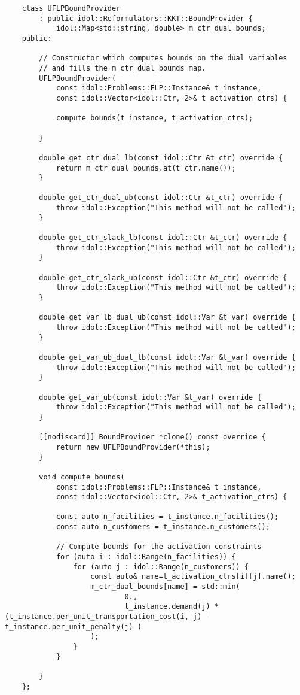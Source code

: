 \begin{lstlisting}
    class UFLPBoundProvider
        : public idol::Reformulators::KKT::BoundProvider {
            idol::Map<std::string, double> m_ctr_dual_bounds;
    public:

        // Constructor which computes bounds on the dual variables 
        // and fills the m_ctr_dual_bounds map.
        UFLPBoundProvider(
            const idol::Problems::FLP::Instance& t_instance,
            const idol::Vector<idol::Ctr, 2>& t_activation_ctrs) {

            compute_bounds(t_instance, t_activation_ctrs);

        }

        double get_ctr_dual_lb(const idol::Ctr &t_ctr) override {
            return m_ctr_dual_bounds.at(t_ctr.name());
        }

        double get_ctr_dual_ub(const idol::Ctr &t_ctr) override {
            throw idol::Exception("This method will not be called");
        }

        double get_ctr_slack_lb(const idol::Ctr &t_ctr) override {
            throw idol::Exception("This method will not be called");
        }

        double get_ctr_slack_ub(const idol::Ctr &t_ctr) override {
            throw idol::Exception("This method will not be called");
        }

        double get_var_lb_dual_ub(const idol::Var &t_var) override {
            throw idol::Exception("This method will not be called");
        }

        double get_var_ub_dual_lb(const idol::Var &t_var) override {
            throw idol::Exception("This method will not be called");
        }

        double get_var_ub(const idol::Var &t_var) override {
            throw idol::Exception("This method will not be called");
        }

        [[nodiscard]] BoundProvider *clone() const override {
            return new UFLPBoundProvider(*this);
        }

        void compute_bounds(
            const idol::Problems::FLP::Instance& t_instance,
            const idol::Vector<idol::Ctr, 2>& t_activation_ctrs) {

            const auto n_facilities = t_instance.n_facilities();
            const auto n_customers = t_instance.n_customers();

            // Compute bounds for the activation constraints
            for (auto i : idol::Range(n_facilities)) {
                for (auto j : idol::Range(n_customers)) {
                    const auto& name=t_activation_ctrs[i][j].name();
                    m_ctr_dual_bounds[name] = std::min(
                            0.,
                            t_instance.demand(j) * (t_instance.per_unit_transportation_cost(i, j) - t_instance.per_unit_penalty(j) )
                    );
                }
            }

        }
    };
\end{lstlisting}

